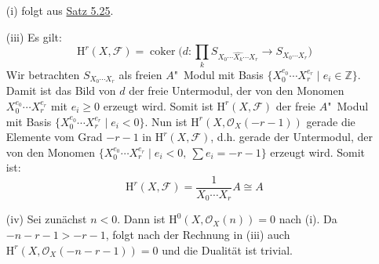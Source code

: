 \begin{enumerate}
\item[(i)] folgt aus \hyperref[5.25]{Satz 5.25}.
\item[(iii)] Es gilt:
\[\mathrm{H}^r(X,\mathcal{F}) = \operatorname{coker}\Big(d:\prod_k S_{X_0\cdots \widehat{X_k}\cdots X_r} \to S_{X_0\cdots X_r} \Big) \]
Wir betrachten $S_{X_0\cdots X_r}$ als freien $A$"~Modul mit Basis $\{X_0^{e_0}\cdots X_r^{e_r}\mid e_i\in\mathbb{Z}\}$. Damit ist das Bild von $d$ der freie Untermodul, der von den Monomen $X_0^{e_0}\cdots X_r^{e_r}$ mit $e_i\geq 0$ erzeugt wird. Somit ist $\mathrm{H}^r(X,\mathcal{F})$ der freie $A$"~Modul mit Basis $\{X_0^{e_0}\cdots X_r^{e_r}\mid e_i < 0\}$. Nun ist $\mathrm{H}^r(X,\mathcal{O}_X(-r-1))$ gerade die Elemente vom Grad $-r-1$ in $\mathrm{H}^r(X,\mathcal{F})$, d.h. gerade der Untermodul, der von den Monomen $\{X_0^{e_0}\cdots X_r^{e_r}\mid e_i<0,\ \sum e_i=-r-1\}$ erzeugt wird. Somit ist:
\[\mathrm{H}^r(X,\mathcal{F}) = \frac{1}{X_0\cdots X_r} A\cong A \]
\item[(iv)] Sei zunächst $n<0$. Dann ist $\mathrm{H}^0(X,\mathcal{O}_X(n))=0$ nach (i). Da $-n-r-1>-r-1$, folgt nach der Rechnung in (iii) auch $\mathrm{H}^r(X,\mathcal{O}_X(-n-r-1))=0$ und die Dualität ist trivial.


\end{enumerate}
